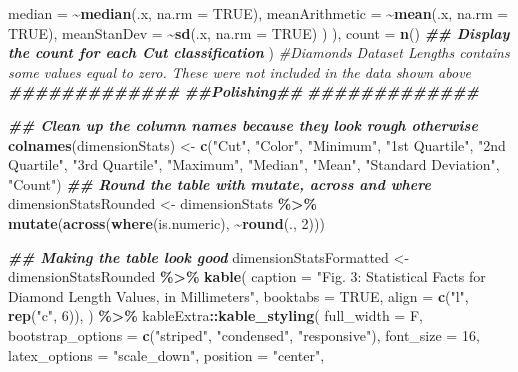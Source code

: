 \documentclass[
]{article}
\newenvironment{Shaded}{\begin{snugshade}}{\end{snugshade}}
\newcommand{\AttributeTok}[1]{\textcolor[rgb]{0.13,0.29,0.53}{#1}}
\newcommand{\CommentTok}[1]{\textcolor[rgb]{0.56,0.35,0.01}{\textit{#1}}}
\newcommand{\ConstantTok}[1]{\textcolor[rgb]{0.56,0.35,0.01}{#1}}
\newcommand{\DecValTok}[1]{\textcolor[rgb]{0.00,0.00,0.81}{#1}}
\newcommand{\DocumentationTok}[1]{\textcolor[rgb]{0.56,0.35,0.01}{\textbf{\textit{#1}}}}
\newcommand{\FunctionTok}[1]{\textcolor[rgb]{0.13,0.29,0.53}{\textbf{#1}}}
\newcommand{\NormalTok}[1]{#1}
\newcommand{\OtherTok}[1]{\textcolor[rgb]{0.56,0.35,0.01}{#1}}
\newcommand{\SpecialCharTok}[1]{\textcolor[rgb]{0.81,0.36,0.00}{\textbf{#1}}}
\newcommand{\StringTok}[1]{\textcolor[rgb]{0.31,0.60,0.02}{#1}}
\begin{document}
\begin{Shaded}
\begin{Highlighting}[]
        \AttributeTok{median =} \SpecialCharTok{\textasciitilde{}}\FunctionTok{median}\NormalTok{(.x, }\AttributeTok{na.rm =} \ConstantTok{TRUE}\NormalTok{),}
        \AttributeTok{meanArithmetic =} \SpecialCharTok{\textasciitilde{}}\FunctionTok{mean}\NormalTok{(.x, }\AttributeTok{na.rm =} \ConstantTok{TRUE}\NormalTok{),}
        \AttributeTok{meanStanDev =} \SpecialCharTok{\textasciitilde{}}\FunctionTok{sd}\NormalTok{(.x, }\AttributeTok{na.rm =} \ConstantTok{TRUE}\NormalTok{)}
\NormalTok{      )}
\NormalTok{    ),}
    \AttributeTok{count =} \FunctionTok{n}\NormalTok{()                                                  }\DocumentationTok{\#\# Display the count for each Cut classification}
\NormalTok{  )}
\CommentTok{\#Diamonds Dataset Lengths contains some values equal to zero. These were not included in the data shown above}
\DocumentationTok{\#\#\#\#\#\#\#\#\#\#\#\#\#}
\DocumentationTok{\#\#Polishing\#\#}
\DocumentationTok{\#\#\#\#\#\#\#\#\#\#\#\#\#}

\DocumentationTok{\#\# Clean up the column names because they look rough otherwise}
\FunctionTok{colnames}\NormalTok{(dimensionStats) }\OtherTok{\textless{}{-}} \FunctionTok{c}\NormalTok{(}\StringTok{"Cut"}\NormalTok{, }\StringTok{"Color"}\NormalTok{, }\StringTok{"Minimum"}\NormalTok{, }\StringTok{"1st Quartile"}\NormalTok{, }\StringTok{"2nd Quartile"}\NormalTok{, }\StringTok{"3rd Quartile"}\NormalTok{, }\StringTok{"Maximum"}\NormalTok{, }\StringTok{"Median"}\NormalTok{, }\StringTok{"Mean"}\NormalTok{, }\StringTok{"Standard Deviation"}\NormalTok{, }\StringTok{"Count"}\NormalTok{)}
\DocumentationTok{\#\# Round the table with mutate, across and where}
\NormalTok{dimensionStatsRounded }\OtherTok{\textless{}{-}}\NormalTok{ dimensionStats }\SpecialCharTok{\%\textgreater{}\%}
  \FunctionTok{mutate}\NormalTok{(}\FunctionTok{across}\NormalTok{(}\FunctionTok{where}\NormalTok{(is.numeric), }\SpecialCharTok{\textasciitilde{}}\FunctionTok{round}\NormalTok{(., }\DecValTok{2}\NormalTok{)))}

\DocumentationTok{\#\# Making the table look good}
\NormalTok{dimensionStatsFormatted }\OtherTok{\textless{}{-}}\NormalTok{ dimensionStatsRounded }\SpecialCharTok{\%\textgreater{}\%}
  \FunctionTok{kable}\NormalTok{(}
    \AttributeTok{caption =} \StringTok{"Fig. 3: Statistical Facts for Diamond Length Values, in Millimeters"}\NormalTok{,}
    \AttributeTok{booktabs =} \ConstantTok{TRUE}\NormalTok{,}
    \AttributeTok{align =} \FunctionTok{c}\NormalTok{(}\StringTok{"l"}\NormalTok{, }\FunctionTok{rep}\NormalTok{(}\StringTok{"c"}\NormalTok{, }\DecValTok{6}\NormalTok{)),}
\NormalTok{  ) }\SpecialCharTok{\%\textgreater{}\%}
\NormalTok{  kableExtra}\SpecialCharTok{::}\FunctionTok{kable\_styling}\NormalTok{(}
    \AttributeTok{full\_width =}\NormalTok{ F,}
    \AttributeTok{bootstrap\_options =} \FunctionTok{c}\NormalTok{(}\StringTok{"striped"}\NormalTok{, }\StringTok{"condensed"}\NormalTok{, }\StringTok{"responsive"}\NormalTok{),}
    \AttributeTok{font\_size =} \DecValTok{16}\NormalTok{,}
    \AttributeTok{latex\_options =} \StringTok{"scale\_down"}\NormalTok{,}
    \AttributeTok{position =} \StringTok{"center"}\NormalTok{,}
    

\end{Highlighting}
\end{Shaded}
\end{document}
